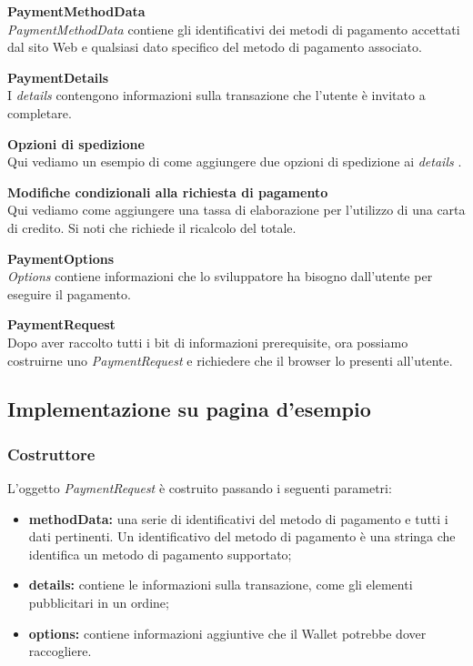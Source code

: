 \documentclass[11pt ,a4paper , twoside , openright ]{book}
\begin{document}
	\pagebreak
	\textbf{PaymentMethodData}
	\\
	\textit{PaymentMethodData} \cite{rif11} contiene gli identificativi dei metodi di pagamento accettati dal sito Web e qualsiasi dato specifico del metodo di pagamento associato.
	
	\textbf{PaymentDetails}
	\\
	I \textit{details} \cite{rif14} contengono informazioni sulla transazione che l'utente è invitato a completare.
	
	\pagebreak
	\textbf{Opzioni di spedizione}
	\\
	Qui vediamo un esempio di come aggiungere due opzioni di spedizione ai \textit{details} \cite{rif16}.
	
	
	\flushleft\textbf{Modifiche condizionali alla richiesta di pagamento}
	\\
	Qui vediamo come aggiungere una tassa di elaborazione per l'utilizzo di una carta di credito. Si noti che richiede il ricalcolo del totale.
	
	\pagebreak
	\textbf{PaymentOptions} \\
	\textit{Options} contiene informazioni che lo sviluppatore ha bisogno dall'utente per eseguire il pagamento.
	
	
	\textbf{PaymentRequest} \\
	Dopo aver raccolto tutti i bit di informazioni prerequisite, ora possiamo costruirne uno \textit{PaymentRequest} e richiedere che il browser lo presenti all'utente.
	
	\pagebreak
	
	\subsection{Implementazione su pagina d'esempio}
	\subsubsection{Costruttore}
	L'oggetto \textit{PaymentRequest} è costruito passando i seguenti parametri:
	\begin{itemize}
		\item \textbf{methodData:} una serie di identificativi del metodo di pagamento e tutti i dati pertinenti. Un identificativo del metodo di pagamento è una stringa che identifica un metodo di pagamento supportato;
		\item \textbf{details:} contiene le informazioni sulla transazione, come gli elementi pubblicitari in un ordine;
		\item \textbf{options:} contiene informazioni aggiuntive che il Wallet potrebbe dover raccogliere.
	\end{itemize}
	
\end{document}
